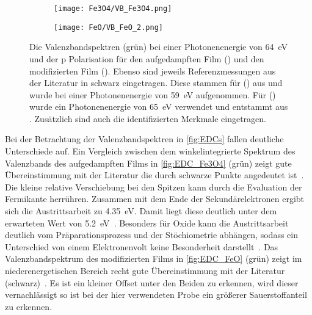         \begin{figure}
            \begin{subfigure}[t]{0.48\textwidth}
                \centering
                \texttt{[image: Fe3O4/VB\_Fe3O4.png]}
                \subcaption{}
                \label{fig:EDC_Fe3O4}
            \end{subfigure}
            \begin{subfigure}[t]{0.48\textwidth}
                \centering
                \texttt{[image: FeO/VB\_FeO\_2.png]}
                \subcaption{}
                \label{fig:EDC_FeO}
            \end{subfigure}
            \caption{Die Valenzbandspektren (grün) bei einer Photonenenergie von \SI{64}{\electronvolt} und der p Polarisation für den aufgedampften Film () und den modifizierten Film ().
            Ebenso sind jeweils Referenzmessungen aus der Literatur in schwarz eingetragen.
            Diese stammen für () aus \cite{FeO_35} und wurde bei einer Photonenenergie von \SI{59}{\electronvolt} aufgenommen.
            Für () wurde ein Photonenenergie von \SI{65}{\electronvolt} verwendet und entstammt aus \cite{FeO_14}.
            Zusätzlich sind auch die identifizierten Merkmale eingetragen.}
            \label{fig:EDCs}
        \end{figure}
        Bei der Betrachtung der Valenzbandspektren in \autoref{fig:EDCs} fallen deutliche Unterschiede auf.     
        Ein Vergleich zwischen dem winkelintegrierte Spektrum des Valenzbands des aufgedampften Films in \autoref{fig:EDC_Fe3O4} (grün) zeigt gute Übereinstimmung mit der Literatur die durch schwarze Punkte angedeutet ist~\cite{FeO_35}.
        Die kleine relative Verschiebung bei den Spitzen kann durch die Evaluation der Fermikante herrühren.
        Zusammen mit dem Ende der Sekundärelektronen ergibt sich die Austrittsarbeit zu \SI{4.35}{\electronvolt}.
        Damit liegt diese deutlich unter dem erwarteten Wert von \SI{5.2}{\electronvolt}~\cite{FeO_40}.
        Besonders für Oxide kann die Austrittsarbeit deutlich vom Präparationsprozess und der Stöchiometrie abhängen, sodass ein Unterschied von einem Elektronenvolt keine Besonderheit darstellt~\cite{IF_11}.
        Das Valenzbandspektrum des modifizierten Films in \autoref{fig:EDC_FeO} (grün) zeigt im niederenergetischen Bereich recht gute Übereinstimmung mit der Literatur (schwarz)~\cite{FeO_14}.
        Es ist ein kleiner Offset unter den Beiden zu erkennen, wird dieser vernachlässigt so ist bei der hier verwendeten Probe ein größerer Sauerstoffanteil zu erkennen.
